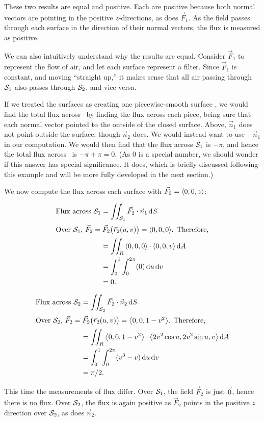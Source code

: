 \begin{example}
These two results are equal and positive. Each are positive because both normal vectors are pointing in the positive $z$-directions, as does $\vec F_1$. As the field passes through each surface in the direction of their normal vectors, the flux is measured as positive.

We can also intuitively understand why the results are equal. Consider $\vec F_1$ to represent the flow of air, and let each surface represent a filter. Since $\vec F_1$ is constant, and moving ``straight up,'' it makes sense that all air passing through $\mathcal{S}_1$ also passes through $\mathcal{S}_2$, and vice-versa. 

If we treated the surfaces as creating one piecewise-smooth surface \surfaceS, we would find the total flux across \surfaceS\ by finding the flux across each piece, being sure that each normal vector pointed to the outside of the closed surface. Above, $\vec n_1$ does not point outside the surface, though $\vec n_2$ does. We would instead want to use $-\vec n_1$ in our computation. We would then find that the flux across $\mathcal{S}_1$ is $-\pi$, and hence the total flux across \surfaceS\ is $-\pi + \pi = 0$. (As $0$ is a special number, we should wonder if this answer has special significance. It does, which is briefly discussed following this example and will be more fully developed in the next section.)

We now compute the flux across each surface with $\vec F_2=\left\langle 0,0,z\right\rangle$:

\begin{align*}
	\text{Flux across }\mathcal{S}_1
	&= \iint_{\mathcal{S}_1} \vec F_2\cdot \vec n_1\operatorname{d}\! S .\\
	\intertext{Over \(\ensuremath{\mathcal{S}}_1\), \(\vec F_2 = \vec F_2\bigl(\vec r_2(u,v)\bigr) =\left\langle 0,0,0\right\rangle\). Therefore,}
	&= \iint_R\left\langle 0,0,0\right\rangle\cdot\left\langle 0,0,v\right\rangle\operatorname{d}\! A\\
	&= \int_0^1\int_0^{2\pi} (0)\operatorname{d}\! u\operatorname{d}\! v\\
	&= 0.
\end{align*}

\begin{align*}
	\text{Flux across }\mathcal{S}_2
	&= \iint_{\mathcal{S}_2} \vec F_2\cdot \vec n_2\operatorname{d}\! S .\\
	\intertext{Over \(\ensuremath{\mathcal{S}}_2\), \(\vec F_2 = \vec F_2\bigl(\vec r_2(u,v)\bigr) =\left\langle 0,0,1-v^2\right\rangle\). Therefore,}
	&= \iint_R\left\langle 0,0,1-v^2\right\rangle\cdot\left\langle 2v^2\cos u,2v^2\sin u,v\right\rangle\operatorname{d}\! A\\
	&= \int_0^1\int_0^{2\pi} (v^3-v)\operatorname{d}\! u\operatorname{d}\! v\\
	&= \pi/2.
\end{align*}

This time the measurements of flux differ. Over $\mathcal{S}_1$, the field $\vec F_2$ is just $\vec 0$, hence there is no flux. Over $\mathcal{S}_2$, the flux is again positive as $\vec F_2$ points in the positive $z$ direction over $\mathcal{S}_2$, as does $\vec n_2$.
\end{example}

